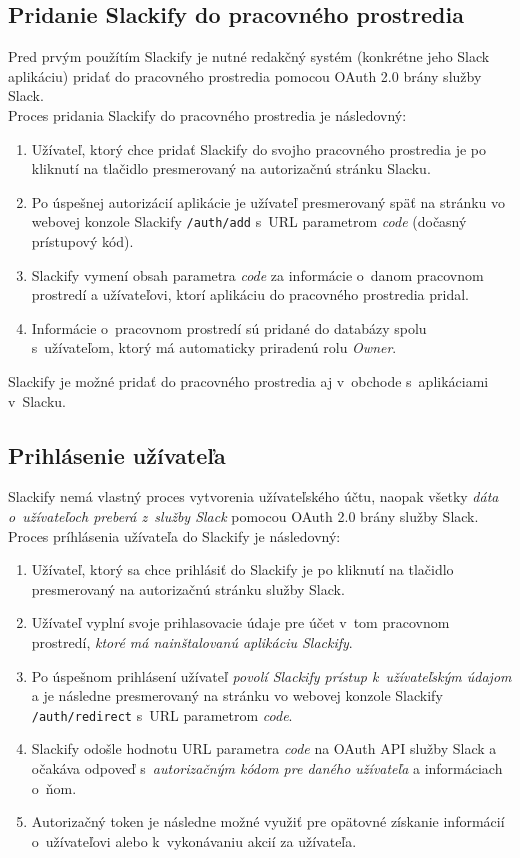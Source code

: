\subsection{Pridanie Slackify do pracovného prostredia}
Pred prvým použítím Slackify je nutné redakčný systém (konkrétne jeho Slack aplikáciu) pridať do pracovného prostredia pomocou OAuth 2.0 brány služby Slack.  \\

\noindent Proces pridania Slackify do pracovného prostredia je následovný:

\begin{enumerate}
	\item Užívateľ, ktorý chce pridať Slackify do svojho pracovného prostredia je po kliknutí na tlačidlo  presmerovaný na autorizačnú stránku Slacku.
	\item Po úspešnej autorizácií aplikácie je užívateľ presmerovaný späť na stránku vo webovej konzole Slackify \texttt{/auth/add} s~URL parametrom \textit{code} (dočasný prístupový kód).
	\item Slackify vymení obsah parametra \textit{code} za informácie o~danom pracovnom prostredí a užívateľovi, ktorí aplikáciu do pracovného prostredia pridal.
	\item Informácie o~pracovnom prostredí sú pridané do databázy spolu s~užívateľom, ktorý má automaticky priradenú rolu \emph{Owner}.
\end{enumerate}

\noindent Slackify je možné pridať do pracovného prostredia aj v~obchode s~aplikáciami v~Slacku. 

\subsection{Prihlásenie užívateľa}
Slackify nemá vlastný proces vytvorenia užívateľského účtu, naopak všetky \emph{dáta o~užívateľoch preberá z~služby Slack} pomocou OAuth 2.0 brány služby Slack. \\

\noindent Proces príhlásenia užívateľa do Slackify je následovný:

\begin{enumerate}
	\item Užívateľ, ktorý sa chce prihlásiť do Slackify je po kliknutí na tlačidlo  presmerovaný na autorizačnú stránku služby Slack.
	\item Užívateľ vyplní svoje prihlasovacie údaje pre účet v~tom pracovnom prostredí, \emph{ktoré má nainštalovanú aplikáciu Slackify}.
	\item Po úspešnom prihlásení užívateľ \emph{povolí Slackify prístup k~užívateľským údajom} a je následne presmerovaný na stránku vo webovej konzole Slackify \texttt{/auth/redirect} s~URL parametrom \textit{code}.
	\item Slackify odošle hodnotu URL parametra \textit{code} na OAuth API služby Slack a očakáva odpoveď s~\emph{autorizačným kódom pre daného užívateľa} a informáciach o~ňom.
	\item Autorizačný token je následne možné využiť pre opätovné získanie informácií o~užívateľovi alebo k~vykonávaniu akcií za užívateľa.
\end{enumerate}

